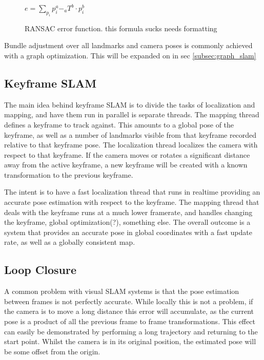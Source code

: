 \begin{figure}
 \centering
 \begin{math}
  e = \sum\limits_{p_i} p^a_i - _aT^b \cdot p^b_i
 \end{math}
 \caption{RANSAC error function.  this formula sucks needs formatting}
 \label{eq:ransac_error}
\end{figure}


Bundle adjustment over all landmarks and camera poses is commonly achieved with a graph
optimization. This will be expanded on in sec \ref{subsec:graph_slam}

\subsection{Keyframe SLAM}

The main idea behind keyframe SLAM is to divide the tasks of localization and mapping, and have
them run in parallel is separate threads.  The mapping thread defines a keyframe to track against. 
This amounts to a global pose of the keyframe, as well as a number of landmarks visible from that
keyframe recorded relative to that keyframe pose.  The localization thread localizes the camera
with respect to that keyframe.  If the camera moves or rotates a significant distance away from
the active keyframe, a new keyframe will be created with a known transformation to the previous
keyframe.

The intent is to have a fast localization thread that runs in realtime providing an accurate pose
estimation with respect to the keyframe.  The mapping thread that deals with the keyframe runs at a
much lower framerate, and handles changing the keyframe, global optimization(?), something else. 
The overall outcome is a system that provides an accurate pose in global coordinates with a fast
update rate, as well as a globally consistent map.

\subsection{Loop Closure}
\label{subsec:loop_closure}

A common problem with visual SLAM systems is that the pose estimation between frames is not
perfectly accurate.  While locally this is not a problem, if the camera is to move a long distance
this error will accumulate, as the current pose is a product of all the previous frame to frame
transformations.  This effect can easily be demonstrated by performing a long trajectory and
returning to the start point.  Whilst the camera is in its original position, the estimated pose
will be some offset from the origin.

